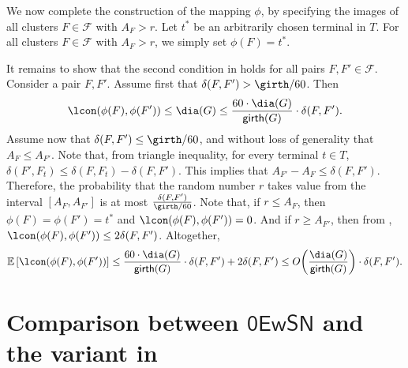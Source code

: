 \documentclass[11pt]{article}
\theoremstyle{definition}
\newcommand{\fset}{{\mathcal{F}}}
\newcommand{\gir}{\textnormal{\textsf{girth}}}
\def\ex#1{{\mathbb{E}}\left[ #1 \right]}
\newcommand{\zesn}{\mathsf{0EwSN}}
\begin{document}
\begin{titlepage}
We now complete the construction of the mapping $\phi$, by specifying the images of all clusters $F\in \fset$ with $A_F> r$. Let $t^*$ be an arbitrarily chosen terminal in $T$. For all clusters $F\in \fset$ with $A_F > r$, we simply set $\phi(F) = t^*$. 


It remains to show that the second condition in  holds for all pairs $F,F'\in \fset$. Consider a pair $F,F'$.
Assume first that $\delta(F,F')>\girth/60$. Then $$\lcon(\phi(F),\phi(F')) \le \dia(G) \le \frac{60 \cdot \dia(G)}{\gir(G)}\cdot \delta(F,F').$$ 
Assume now that $\delta(F,F') \le \girth/60$, and without loss of generality that $A_{F} \le A_{F'}$. 
Note that, from triangle inequality, for every terminal $t\in T$, $\delta(F',F_t)\le \delta(F,F_t)-\delta(F,F')$. This implies that $A_{F'}-A_{F} \le \delta(F,F')$. Therefore, the probability that the random number $r$ takes value from the interval $[A_{F}, A_{F'}]$ is at most $\frac{\delta(F,F')}{\girth/60}$. %
Note that, if $r\le A_{F}$, then $\phi(F)=\phi(F')=t^*$ and $\lcon(\phi(F),\phi(F'))=0$.
And  if $r\ge A_{F'}$, then from , $\lcon(\phi(F),\phi(F')) \le 2\delta(F,F')$. Altogether,
$$\ex{\lcon(\phi(F),\phi(F'))} \le \frac{60\cdot \dia(G)}{\gir(G)} \cdot\delta(F,F') + 2 \delta(F,F') \le O\bigg(\frac{\dia(G)}{\gir(G)}\bigg)\cdot \delta(F,F').$$




%

\appendix
\section{Comparison between $\zesn$ and the variant in \cite{andoni2014towards}}
\label{sec: compare}


\end{titlepage}
\end{document}
